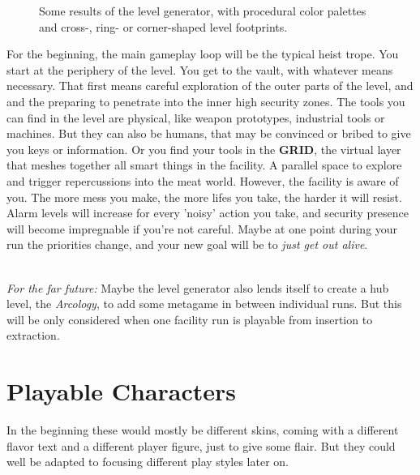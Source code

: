\documentclass[11pt,a4paper]{article}
\begin{document}
\begin{figure}
    \caption{Some results of the level generator, with procedural color palettes and cross-, ring- or corner-shaped
            level footprints.}
\end{figure}

For the beginning, the main gameplay loop will be the typical heist trope. You start at the periphery of the level.
You get to the vault, with whatever means necessary. That first means careful exploration of the outer parts of the
level, and and the preparing to penetrate into the inner high security zones.
The tools you can find in the level are physical, like weapon prototypes, industrial tools or machines. But they can
also be humans, that may be convinced or bribed to give you keys or information. Or you find your tools in the
\textbf{GRID}, the virtual layer that meshes together all smart things in the facility. A parallel space to explore
and trigger repercussions into the meat world.
However, the facility is aware of you. The more mess you make, the more lifes you take, the harder it will resist.
Alarm levels will increase for every 'noisy' action you take, and security presence will become impregnable if you're
not careful. Maybe at one point during your run the priorities change, and your new goal will be to
\textit{just get out alive}.\\  \

\textit{For the far future:} Maybe the level generator also lends itself to create a hub level, the \textit{Arcology}, to add
some metagame in between individual runs. But this will be only considered when one facility run is playable from
insertion to extraction.

%
%
%

\newpage

\section{Playable Characters}

In the beginning these would mostly be different skins, coming with a different flavor text and a different player
figure, just to give some flair. But they could well be adapted to focusing different play styles later on.
\end{document}
